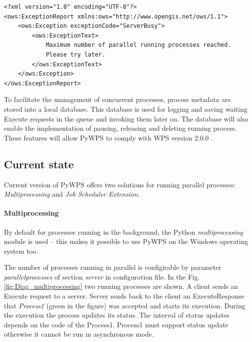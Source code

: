 \documentclass{gifce}
\begin{document}
\begin{lstlisting}[basicstyle=\small,caption={Resource exceeded exception},label={lst:Isolation_rejected}]
<?xml version="1.0" encoding="UTF-8"?>
<ows:ExceptionReport xmlns:ows="http://www.opengis.net/ows/1.1">
    <ows:Exception exceptionCode="ServerBusy">
        <ows:ExceptionText>
            Maximum number of parallel running processes reached. 
            Please try later.
        </ows:ExceptionText>
    </ows:Exception>
</ows:ExceptionReport>
\end{lstlisting}

To facilitate the management of concurrent processes, process metadata
are stored into a local database. This database is used for logging
and saving waiting Execute requests in the queue and invoking them
later on. The database will also enable the implementation of
pausing, releasing and deleting running process. These features will
allow PyWPS to comply with WPS version 2.0.0 \cite{WPS_standart_2.0}.

\subsection{Current state}
Current version of PyWPS offers two solutions for running parallel processes: \textit{Multiprocessing}
and \textit{Job Scheduler Extension}.

\paragraph{Multiprocessing}
By default for  processes running in the background, the Python \textit{multiprocessing} module is used – 
this makes it possible to use PyWPS on the Windows operating system too.

The number of processes running in parallel is configirable by parameter \textit{parallelprocesses} of section \textit{server} in 
configuration file. In the Fig. \ref{fig:Diag_multiprocessing} two running processes are shown. A client sends an Execute request to
a server. Server sends back to the client an ExecuteResponse that \textit{Process1} (green in the figure) was accepted and starts its 
execution. During the execution the process updates its status. The interval of status updates depends on the code of the Process1.
Process1 must support status update otherwise it cannot be run in asynchronous mode.
\end{document}
